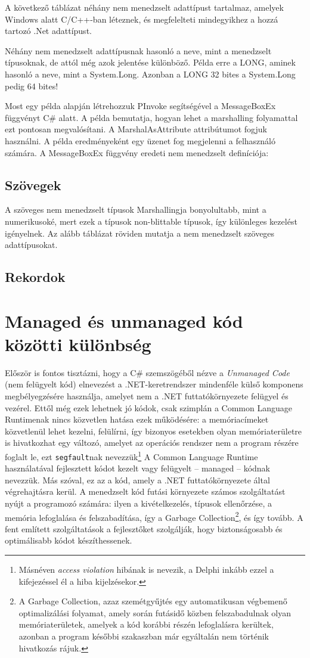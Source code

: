 \documentclass[tocnopagenum]{thesis-ekf}
\theoremstyle{definition}
\theoremstyle{remark}
\begin{document}
	A következő táblázat néhány nem menedzselt adattípust tartalmaz, amelyek Windows alatt C/C++-ban léteznek, és megfelelteti mindegyikhez a hozzá tartozó .Net adattípust.
	
	Néhány nem menedzselt adattípusnak hasonló a neve, mint a menedzselt típusoknak, de attól még azok jelentése különböző. Példa erre a LONG, aminek hasonló a neve, mint a System.Long. Azonban a LONG 32 bites a System.Long pedig 64 bites!
	
	Most egy példa alapján létrehozzuk PInvoke segítségével a MessageBoxEx függvényt C\# alatt. A példa bemutatja, hogyan lehet a marshalling folyamattal ezt pontosan megvalósítani. A MarshalAsAttribute attribútumot fogjuk használni. A példa eredményeként egy üzenet fog megjelenni a felhasználó számára. A MessageBoxEx függvény eredeti nem menedzselt definíciója:
	\subsection{Szövegek}
		A szöveges nem menedzselt típusok Marshallingja bonyolultabb, mint a numerikusoké, mert ezek a típusok non-blittable típusok, így különleges kezelést igényelnek. Az alább táblázat röviden mutatja a nem menedzselt szöveges adattípusokat.
		\cite{marshalling_strings}
	\subsection{Rekordok}
	\section{Managed és unmanaged kód közötti különbség}
	\label{managed_unmanaged}
	Először is fontos tisztázni, hogy a C\# szemszögéből nézve a \textit{Unmanaged Code} (nem felügyelt kód) elnevezést a .NET-keretrendszer mindenféle külső komponens megbélyegzésére használja, amelyet nem a .NET futtatókörnyezete felügyel és vezérel. Ettől még ezek lehetnek jó kódok, csak szimplán a Common Language Runtimenak nincs közvetlen hatása ezek működésére: a memóriacímeket közvetlenül lehet kezelni, felülírni, így bizonyos esetekben olyan memóriaterületre is hivatkozhat egy változó, amelyet az operációs rendszer nem a program részére foglalt le, ezt \verb*|segfault|nak nevezzük\footnote{Másnéven \textit{access violation} hibának is nevezik, a Delphi inkább ezzel a kifejezéssel él a hiba kijelzésekor.}
	\cite{managed} 
	A Common Language Runtime használatával fejlesztett kódot kezelt vagy felügyelt -- managed -- kódnak nevezzük. Más szóval, ez az a kód, amely a .NET futtatókörnyezete által végrehajtásra kerül. 
	A menedzselt kód futási környezete számos szolgáltatást nyújt a programozó számára: ilyen a kivételkezelés, típusok ellenőrzése, a memória lefoglalása és felszabadítása, így a Garbage Collection\footnote{A Garbage Collection, azaz szemétgyűjtés egy automatikusan végbemenő optimalizálási folyamat, amely során futásidő közben felszabadulnak olyan memóriaterületek, amelyek a kód korábbi részén lefoglalásra kerültek, azonban a program későbbi szakaszban már egyáltalán nem történik hivatkozás rájuk.}, és így tovább. A fent említett szolgáltatások a fejlesztőket szolgálják, hogy biztonságosabb és optimálisabb kódot készíthessenek.
	\cite{marshalling_serialization}
\end{document}
